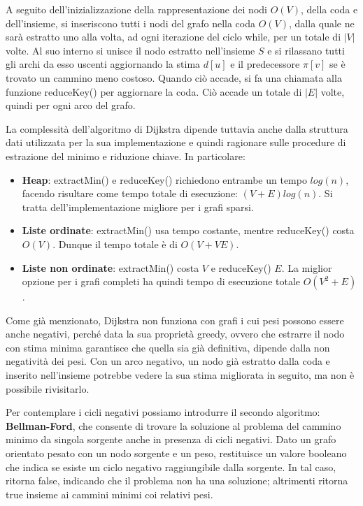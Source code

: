 \noindent A seguito dell'inizializzazione della rappresentazione dei nodi $O(V)$, della coda e dell'insieme, si inseriscono tutti i nodi del grafo
nella coda $O(V)$, dalla quale ne sarà estratto uno alla volta, ad ogni iterazione del ciclo while, per un totale di $|V|$ volte.
Al suo interno si unisce il nodo estratto nell'insieme $S$ e si rilassano tutti gli archi da esso uscenti aggiornando la stima $d[u]$ e il predecessore
$\pi[v]$ se è trovato un cammino meno costoso. Quando ciò accade, si fa una chiamata alla funzione reduceKey() per aggiornare la coda. Ciò accade un 
totale di $|E|$ volte, quindi per ogni arco del grafo.\par
La complessità dell'algoritmo di Dijkstra dipende tuttavia anche dalla struttura dati utilizzata per la sua implementazione e quindi ragionare sulle
procedure di estrazione del minimo e riduzione chiave. In particolare: \begin{itemize}
	\item \textbf{Heap}: extractMin() e reduceKey() richiedono entrambe un tempo $log(n)$, facendo risultare come tempo totale di esecuzione: $(V+E)log(n)$.
	Si tratta dell'implementazione migliore per i grafi sparsi.
	\item \textbf{Liste ordinate}: extractMin() usa tempo costante, mentre reduceKey() costa $O(V)$. Dunque il tempo totale è di $O(V+VE)$.
	\item \textbf{Liste non ordinate}: extractMin() costa $V$ e reduceKey() $E$. La miglior opzione per i grafi completi ha quindi tempo di esecuzione
	totale $O(V^2 + E)$.
\end{itemize}
\noindent Come già menzionato, Dijkstra non funziona con grafi i cui pesi possono essere anche negativi, perché data la sua proprietà greedy, ovvero che
estrarre il nodo con stima minima garantisce che quella sia già definitiva, dipende dalla non negatività dei pesi. Con un arco negativo, un nodo già
estratto dalla coda e inserito nell'insieme potrebbe vedere la sua stima migliorata in seguito, ma non è possibile rivisitarlo.\par
Per contemplare i cicli negativi possiamo introdurre il secondo algoritmo: \textbf{Bellman-Ford}, che consente di trovare la soluzione al problema del
cammino minimo da singola sorgente anche in presenza di cicli negativi. Dato un grafo orientato pesato con un nodo sorgente e un peso, restituisce un
valore booleano che indica se esiste un ciclo negativo raggiungibile dalla sorgente. In tal caso, ritorna false, indicando che il problema non ha una
soluzione; altrimenti ritorna true insieme ai cammini minimi coi relativi pesi.
